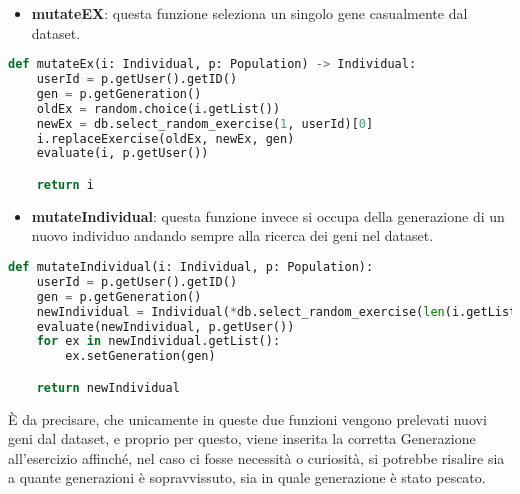 \documentclass{article}
\begin{document}
\begin{itemize}
\item\textbf{mutateEX}: questa funzione seleziona un singolo gene casualmente dal dataset.
\end{itemize}

\begin{lstlisting}[language = Python]
def mutateEx(i: Individual, p: Population) -> Individual:
    userId = p.getUser().getID()
    gen = p.getGeneration()
    oldEx = random.choice(i.getList())
    newEx = db.select_random_exercise(1, userId)[0]
    i.replaceExercise(oldEx, newEx, gen)
    evaluate(i, p.getUser())

    return i
\end{lstlisting}

\begin{itemize}
\item\textbf{mutateIndividual}: questa funzione invece si occupa della generazione di un nuovo individuo andando sempre alla ricerca dei geni nel dataset.
\end{itemize}

\begin{lstlisting}[language = Python]
def mutateIndividual(i: Individual, p: Population):
    userId = p.getUser().getID()
    gen = p.getGeneration()
    newIndividual = Individual(*db.select_random_exercise(len(i.getList()), userId))
    evaluate(newIndividual, p.getUser())
    for ex in newIndividual.getList():
        ex.setGeneration(gen)

    return newIndividual
\end{lstlisting}

    È da precisare, che unicamente in queste due funzioni vengono prelevati nuovi geni dal dataset, e proprio per questo, viene inserita la corretta Generazione all'esercizio affinché, nel caso ci fosse necessità o curiosità, si potrebbe risalire sia a quante generazioni è sopravvissuto, sia in quale generazione è stato pescato.

\pagebreak
\end{document}
